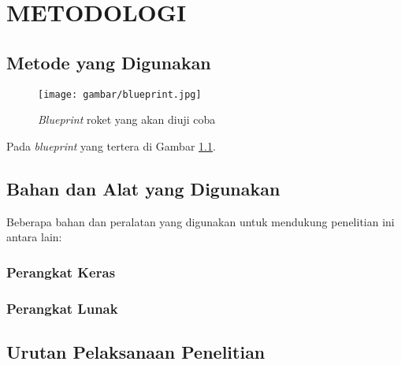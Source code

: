 \chapter{METODOLOGI}


\section{Metode yang Digunakan}

\lipsum[11]

\begin{figure} [H] \centering
  \texttt{[image: gambar/blueprint.jpg]}
  \caption{\emph{Blueprint} roket yang akan diuji coba \parencite{SpaceXBlueprint}}
  \label{fig:Blueprint}
\end{figure}

Pada \emph{blueprint} yang tertera di Gambar \ref{fig:Blueprint}. \lipsum[12]

\section{Bahan dan Alat yang Digunakan}

Beberapa bahan dan peralatan yang digunakan untuk mendukung penelitian ini antara lain:

\subsection{Perangkat Keras}
\lipsum[13]

\subsection{Perangkat Lunak}
\lipsum[14]

\section{Urutan Pelaksanaan Penelitian}

\lipsum[17]
